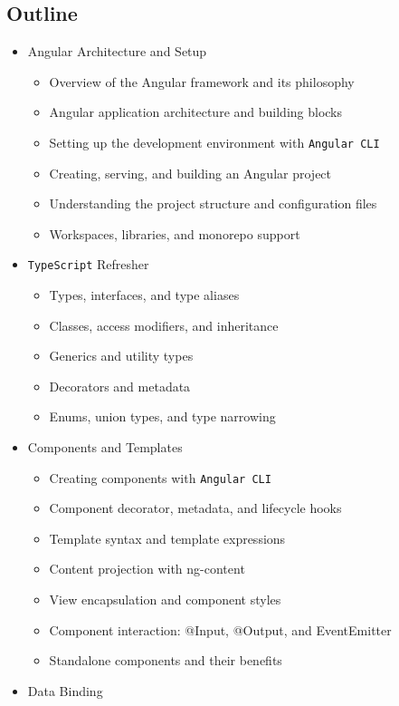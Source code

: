 \documentclass[
]{article}
\providecommand{\tightlist}{%
  \setlength{\itemsep}{0pt}\setlength{\parskip}{0pt}}
\begin{document}
\subsection{Outline}\label{outline}

\begin{itemize}
\tightlist
\item
  Angular Architecture and Setup

  \begin{itemize}
  \tightlist
  \item
    Overview of the Angular framework and its philosophy
  \item
    Angular application architecture and building blocks
  \item
    Setting up the development environment with \texttt{Angular\ CLI}
  \item
    Creating, serving, and building an Angular project
  \item
    Understanding the project structure and configuration files
  \item
    Workspaces, libraries, and monorepo support
  \end{itemize}
\item
  \texttt{TypeScript} Refresher

  \begin{itemize}
  \tightlist
  \item
    Types, interfaces, and type aliases
  \item
    Classes, access modifiers, and inheritance
  \item
    Generics and utility types
  \item
    Decorators and metadata
  \item
    Enums, union types, and type narrowing
  \end{itemize}
\item
  Components and Templates

  \begin{itemize}
  \tightlist
  \item
    Creating components with \texttt{Angular\ CLI}
  \item
    Component decorator, metadata, and lifecycle hooks
  \item
    Template syntax and template expressions
  \item
    Content projection with ng-content
  \item
    View encapsulation and component styles
  \item
    Component interaction: @Input, @Output, and EventEmitter
  \item
    Standalone components and their benefits
  \end{itemize}
\item
  Data Binding


\end{itemize}
\end{document}
